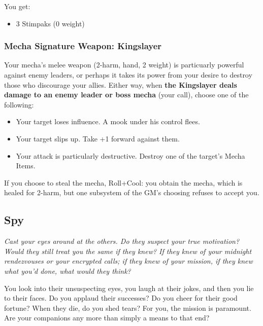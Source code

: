 You get:
\begin{itemize}
\item 3 Stimpaks (0 weight)
\end{itemize}

\subsubsection{Mecha Signature Weapon: Kingslayer}
Your mecha's melee weapon (2-harm, hand, 2 weight) is particuarly powerful against enemy leaders, or perhaps it takes its power from your desire to destroy those who discourage your allies. Either way, when \textbf{the Kingslayer deals damage to an enemy leader or boss mecha} (your call), choose one of the following:
\begin{itemize}
\item Your target loses influence. A mook under his control flees.
\item Your target slips up. Take +1 forward against them.
\item Your attack is particularly destructive. Destroy one of the target's Mecha Items.
\end{itemize}


If you choose to steal the mecha, Roll+Cool:
{you obtain the mecha, which is healed for 2-harm, but one subsystem of the GM's choosing refuses to accept you.}



\subsection{Spy}

{\itshape Cast your eyes around at the others. Do they suspect your
  true motivation? Would they still treat you the same if they knew?
  If they knew of your midnight rendezvouses or your encrypted calls;
  if they knew of your mission, if they knew what you'd done, what
  would they think?

You look into their unsuspecting eyes, you laugh at their jokes, and
then you lie to their faces. Do you applaud their successes? Do you
cheer for their good fortune? When they die, do you shed tears? For
you, the mission is paramount. Are your companions any more than
simply a means to that end?}

